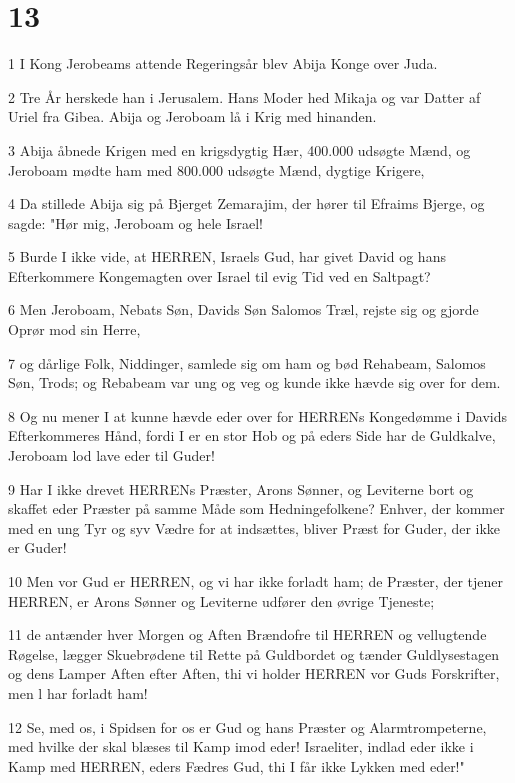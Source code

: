 \chapter{13}

\par 1 I Kong Jerobeams attende Regeringsår blev Abija Konge over Juda.
\par 2 Tre År herskede han i Jerusalem. Hans Moder hed Mikaja og var Datter af Uriel fra Gibea. Abija og Jeroboam lå i Krig med hinanden.
\par 3 Abija åbnede Krigen med en krigsdygtig Hær, 400.000 udsøgte Mænd, og Jeroboam mødte ham med 800.000 udsøgte Mænd, dygtige Krigere,
\par 4 Da stillede Abija sig på Bjerget Zemarajim, der hører til Efraims Bjerge, og sagde: "Hør mig, Jeroboam og hele Israel!
\par 5 Burde I ikke vide, at HERREN, Israels Gud, har givet David og hans Efterkommere Kongemagten over Israel til evig Tid ved en Saltpagt?
\par 6 Men Jeroboam, Nebats Søn, Davids Søn Salomos Træl, rejste sig og gjorde Oprør mod sin Herre,
\par 7 og dårlige Folk, Niddinger, samlede sig om ham og bød Rehabeam, Salomos Søn, Trods; og Rebabeam var ung og veg og kunde ikke hævde sig over for dem.
\par 8 Og nu mener I at kunne hævde eder over for HERRENs Kongedømme i Davids Efterkommeres Hånd, fordi I er en stor Hob og på eders Side har de Guldkalve, Jeroboam lod lave eder til Guder!
\par 9 Har I ikke drevet HERRENs Præster, Arons Sønner, og Leviterne bort og skaffet eder Præster på samme Måde som Hedningefolkene? Enhver, der kommer med en ung Tyr og syv Vædre for at indsættes, bliver Præst for Guder, der ikke er Guder!
\par 10 Men vor Gud er HERREN, og vi har ikke forladt ham; de Præster, der tjener HERREN, er Arons Sønner og Leviterne udfører den øvrige Tjeneste;
\par 11 de antænder hver Morgen og Aften Brændofre til HERREN og vellugtende Røgelse, lægger Skuebrødene til Rette på Guldbordet og tænder Guldlysestagen og dens Lamper Aften efter Aften, thi vi holder HERREN vor Guds Forskrifter, men l har forladt ham!
\par 12 Se, med os, i Spidsen for os er Gud og hans Præster og Alarmtrompeterne, med hvilke der skal blæses til Kamp imod eder! Israeliter, indlad eder ikke i Kamp med HERREN, eders Fædres Gud, thi I får ikke Lykken med eder!"
